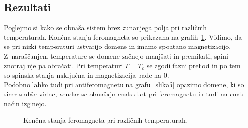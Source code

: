 \documentclass[a4paper,pdftex,10pt]{article}
\numberwithin{figure}{section} %
\begin{document}
\subsection{Rezultati}
Poglejmo si kako se obnaša sistem brez zunanjega polja pri različnih temperaturah. Končna
stanja feromagneta so prikazana na grafih~\ref{slika3}. Vidimo, da se pri nizki 
temperaturi ustvarijo domene in imamo spontano magnetizacijo. Z~naraščanjem temperature 
se domene začnejo manjšati in premikati, spini znotraj nje pa obračati. Pri temperaturi 
$T = T_c$ se zgodi fazni prehod in po tem so spinska stanja naključna in magnetizacija 
pade na $0$. \\
Podobno lahko tudi pri antiferomagnetu na grafu~\ref{slika5} opazimo domene, ki so sicer 
slabše vidne, vendar se obnašajo enako kot pri feromagnetu in tudi na enak način izginejo.
\begin{figure}    
    \centering 
    \begin{subfigure}[b]{0.49\linewidth}
	\resizebox{\textwidth}{!}{} 
    \end{subfigure}
    \begin{subfigure}[b]{0.49\linewidth}
	\resizebox{\textwidth}{!}{} 
    \end{subfigure}
    
    \begin{subfigure}[b]{0.49\linewidth}
	\resizebox{\textwidth}{!}{} 
    \end{subfigure}
    \begin{subfigure}[b]{0.49\linewidth}
	\resizebox{\textwidth}{!}{} 
    \end{subfigure}
    
    \begin{subfigure}[b]{0.49\linewidth}
	\resizebox{\textwidth}{!}{} 
    \end{subfigure}
    \begin{subfigure}[b]{0.49\linewidth}
	\resizebox{\textwidth}{!}{} 
    \end{subfigure}
    \caption{Končna stanja feromagneta pri različnih temperaturah.}
    \label{slika3}
\end{figure}
\end{document}
